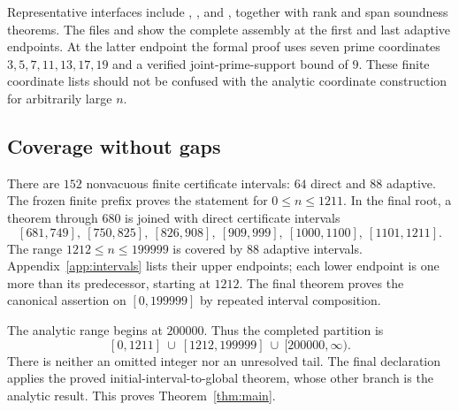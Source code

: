 Representative interfaces include , , and , together with rank and span soundness theorems. The files  and  show the complete assembly at the first and last adaptive endpoints. At the latter endpoint the formal proof uses seven prime coordinates $3,5,7,11,13,17,19$ and a verified joint-prime-support bound of $9$. These finite coordinate lists should not be confused with the analytic coordinate construction for arbitrarily large $n$.

\subsection{Coverage without gaps}
There are $152$ nonvacuous finite certificate intervals: $64$ direct and $88$ adaptive. The frozen finite prefix proves the statement for $0\le n\le1211$. In the final root, a theorem through $680$ is joined with direct certificate intervals
\[
 [681,749],\ [750,825],\ [826,908],\ [909,999],\ [1000,1100],\ [1101,1211].
\]
The range $1212\le n\le199999$ is covered by $88$ adaptive intervals. Appendix~\ref{app:intervals} lists their upper endpoints; each lower endpoint is one more than its predecessor, starting at $1212$. The final theorem  proves the canonical assertion on $[0,199999]$ by repeated interval composition.

The analytic range begins at $200000$. Thus the completed partition is
\[
 [0,1211]\ \cup\ [1212,199999]\ \cup\ [200000,\infty).
\]
There is neither an omitted integer nor an unresolved tail. The final declaration applies the proved initial-interval-to-global theorem, whose other branch is the analytic result. This proves Theorem~\ref{thm:main}.

